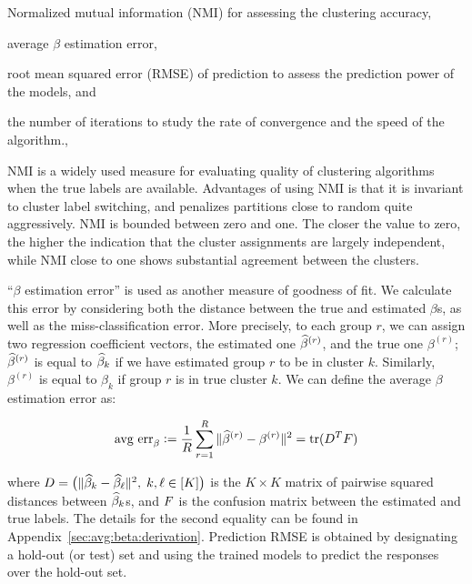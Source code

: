 \documentclass[12pt]{article}
\begin{document}
 \begin{enumerate*}[label=(\arabic*)] 
	\item Normalized mutual information (NMI) for assessing the clustering accuracy,
	\item average $\beta$ estimation error,
	\item root mean squared error (RMSE) of prediction to assess the prediction power of the models, and
	\item the number of iterations to study the rate of convergence and the speed of the algorithm.,
\end{enumerate*} 


NMI is a widely used measure for evaluating quality of clustering algorithms when the true labels are available. Advantages of using NMI is that it is invariant to cluster label switching, and penalizes partitions close to random quite aggressively. NMI is  bounded between zero and one. The closer the value to zero, the higher the indication that the cluster assignments are largely independent, while NMI close to one shows substantial agreement between the clusters. %

``$\beta$ estimation error'' is used as another measure of goodness of fit.  We calculate this error by considering both the distance between the true and estimated $\beta$s, as well as  the miss-classification error. More precisely, to each group $r$, we can assign two regression coefficient vectors,  the estimated one $\widehat \beta^{(r)}$, and the true one $\beta^{(r)}$; $\widehat \beta^{(r)}$ is equal to $\widehat \beta_k$ if we have estimated group $r$ to  be in cluster $k$. Similarly, $\beta^{(r)}$ is equal to $\beta_k$ if group $r$ is in true cluster $k$.  We can define the average $\beta$ estimation error as:

\begin{align}
\label{eq:avg:beta:err}
\text{avg err}_{\beta} :=\frac1R \sum_{r=1}^R \|\widehat \beta^{(r)}- \beta^{(r)}\|^2= \text{tr}(D^T F)
\end{align}

where $D=\big(\|\widehat \beta_k-\widehat \beta_\ell\|^2, \; k, \ell \in [K] \big)$ is the $K\times K$ matrix of pairwise squared distances between $\widehat \beta_k$s, and $F$ is the confusion matrix between the estimated and true labels. The details for the second equality can be found in Appendix~\ref{sec:avg:beta:derivation}.
Prediction RMSE is obtained by designating  a hold-out (or test) set and using the trained models to predict the responses over the hold-out set.  
\end{document}
